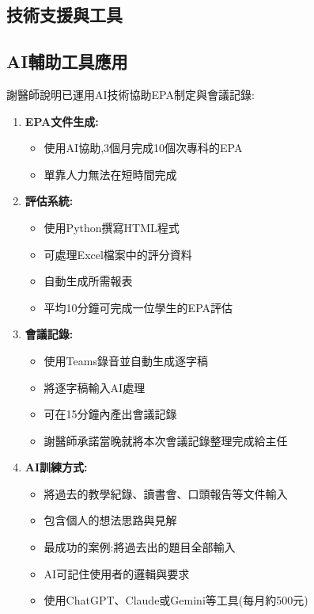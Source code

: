 \documentclass[12pt,a4paper]{article}
\begin{document}
\begin{enumerate}[leftmargin=*]
\section{技術支援與工具}

\subsection{AI輔助工具應用}

謝醫師說明已運用AI技術協助EPA制定與會議記錄:

\begin{enumerate}[leftmargin=*]
    \item \textbf{EPA文件生成:}
    \begin{itemize}
        \item 使用AI協助,3個月完成10個次專科的EPA
        \item 單靠人力無法在短時間完成
    \end{itemize}
    
    \item \textbf{評估系統:}
    \begin{itemize}
        \item 使用Python撰寫HTML程式
        \item 可處理Excel檔案中的評分資料
        \item 自動生成所需報表
        \item 平均10分鐘可完成一位學生的EPA評估
    \end{itemize}
    
    \item \textbf{會議記錄:}
    \begin{itemize}
        \item 使用Teams錄音並自動生成逐字稿
        \item 將逐字稿輸入AI處理
        \item 可在15分鐘內產出會議記錄
        \item 謝醫師承諾當晚就將本次會議記錄整理完成給主任
    \end{itemize}
    
    \item \textbf{AI訓練方式:}
    \begin{itemize}
        \item 將過去的教學紀錄、讀書會、口頭報告等文件輸入
        \item 包含個人的想法思路與見解
        \item 最成功的案例:將過去出的題目全部輸入
        \item AI可記住使用者的邏輯與要求
        \item 使用ChatGPT、Claude或Gemini等工具(每月約500元)
    \end{itemize}
\end{enumerate}


\end{enumerate}
\end{document}
